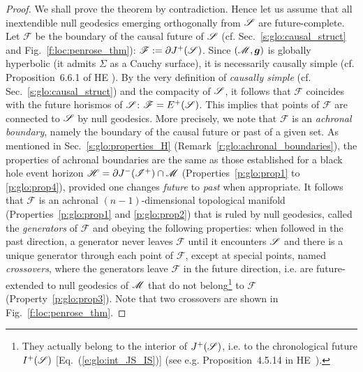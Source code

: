 \begin{proof}
We shall prove the theorem by contradiction. Hence let us assume that all
inextendible null geodesics emerging orthogonally from $\mathscr{S}$ are future-complete. Let $\mathscr{F}$
be the boundary of the causal future of $\mathscr{S}$
(cf. Sec.~\ref{s:glo:causal_struct} and Fig.~\ref{f:loc:penrose_thm}): $\mathscr{F} := \partial J^+(\mathscr{S})$.
Since $(\mathscr{M},\bm{g})$ is globally hyperbolic (it admits $\Sigma$ as a Cauchy surface),
it is necessarily causally simple
(cf. Proposition~6.6.1 of HE \cite{HawkiE73}).
By the very definition of \emph{causally simple}
(cf. Sec.~\ref{s:glo:causal_struct}) and the compacity of $\mathscr{S}$, it follows that
$\mathscr{F}$ coincides with the future horismos of $\mathscr{S}$:
$\mathscr{F} = E^+(\mathscr{S})$. This implies that points of $\mathscr{F}$ are connected to $\mathscr{S}$
by null geodesics. More precisely, we note that
$\mathscr{F}$ is an \emph{achronal boundary},
namely the boundary of the causal future or past of a given set.
As mentioned in Sec.~\ref{s:glo:properties_H} (Remark~\ref{r:glo:achronal_boundaries}),
the properties of achronal boundaries are the same as those established for a black hole event horizon
$\mathscr{H} = \partial J^-(\mathscr{I}^+) \cap \mathscr{M}$ (Properties~\ref{p:glo:prop1} to \ref{p:glo:prop4}),
provided one changes \emph{future} to \emph{past} when appropriate.
It follows that $\mathscr{F}$ is an achronal $(n-1)$-dimensional topological manifold
(Properties~\ref{p:glo:prop1} and \ref{p:glo:prop2}) that is ruled by null geodesics,
called the \emph{generators} of $\mathscr{F}$ and
obeying the following properties:
when followed in the past direction, a generator never leaves $\mathscr{F}$ until it encounters $\mathscr{S}$
and there is a unique generator through each point of $\mathscr{F}$, except at special
points, named \emph{crossovers}, where the generators leave
$\mathscr{F}$ in the future direction,
i.e. are future-extended to null geodesics of $\mathscr{M}$ that do not belong\footnote{They actually
belong to the interior of $J^+(\mathscr{S})$, i.e. to the chronological future $I^+(\mathscr{S})$
[Eq.~(\ref{e:glo:int_JS_IS})] (see e.g. Proposition~4.5.14 in HE~\cite{HawkiE73}).}
to $\mathscr{F}$ (Property~\ref{p:glo:prop3}). Note that two crossovers are shown in
Fig.~\ref{f:loc:penrose_thm}.


\end{proof}
